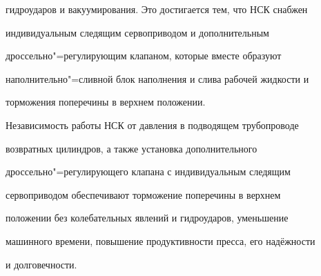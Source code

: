 гидроударов и вакуумирования. Это достигается тем, что НСК снабжен

индивидуальным следящим сервоприводом и дополнительным

дроссельно"=регулирующим клапаном, которые вместе образуют

наполнительно"=сливной блок наполнения и слива рабочей жидкости и

торможения поперечины в верхнем положении.



Независимость работы НСК от  давления в подводящем трубопроводе

возвратных цилиндров, а также установка дополнительного

дроссельно"=регулирующего клапана с индивидуальным следящим

сервоприводом обеспечивают торможение поперечины в верхнем

положении без колебательных явлений и гидроударов, уменьшение

машинного времени, повышение продуктивности пресса, его надёжности

и долговечности.





